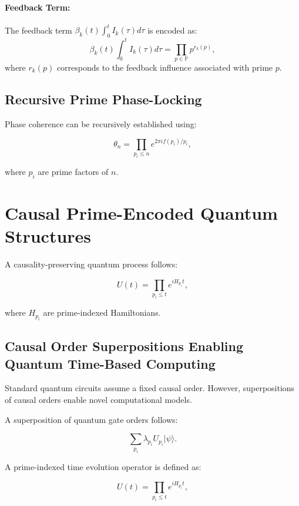 \documentclass{article}
\theoremstyle{plain}
\begin{document}
\paragraph{Feedback Term:}
The feedback term \(\beta_k(t) \int_0^t I_k(\tau) d\tau\) is encoded as:
\begin{equation}
\beta_k(t) \int_0^t I_k(\tau) d\tau = \prod_{p \in \mathbb{P}} p^{r_k(p)},
\end{equation}
where \(r_k(p)\) corresponds to the feedback influence associated with prime \(p\).
\subsection{Recursive Prime Phase-Locking}
Phase coherence can be recursively established using:

\begin{equation}
\theta_n = \prod_{p_i \leq n} e^{2\pi i f(p_i) / p_i},
\end{equation}

where \( p_i \) are prime factors of \( n \).



\section{Causal Prime-Encoded Quantum Structures}
A causality-preserving quantum process follows:

\begin{equation}
U(t) = \prod_{p_i \leq t} e^{i H_{p_i} t},
\end{equation}

where \( H_{p_i} \) are prime-indexed Hamiltonians.

\subsection{Causal Order Superpositions Enabling Quantum Time-Based Computing}

Standard quantum circuits assume a fixed causal order. However, superpositions of causal orders enable novel computational models.

A superposition of quantum gate orders follows:

\begin{equation}
\sum_{p_i} \lambda_{p_i} U_{p_i} |\psi\rangle.
\end{equation}

A prime-indexed time evolution operator is defined as:

\begin{equation}
U(t) = \prod_{p_i \leq t} e^{i H_{p_i} t},
\end{equation}
\end{document}
